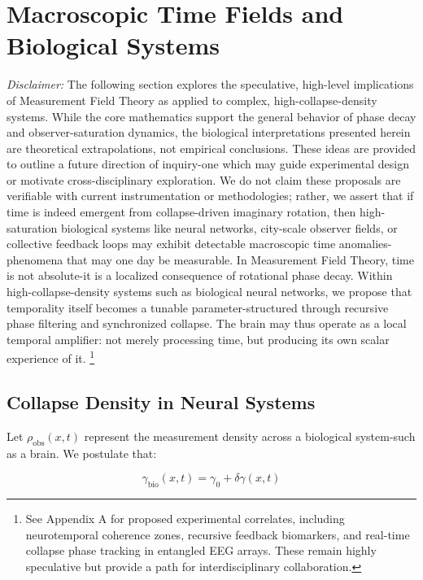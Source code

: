 \section{Macroscopic Time Fields and Biological Systems}

\textit{Disclaimer:} The following section explores the speculative, high-level implications of Measurement Field Theory as applied to complex, high-collapse-density systems. \cite{chapter_time} While the core mathematics support the general behavior of phase decay and observer-saturation dynamics, the biological interpretations presented herein are theoretical extrapolations, not empirical conclusions. \cite{chapter_time} These ideas are provided to outline a future direction of inquiry-one which may guide experimental design or motivate cross-disciplinary exploration. We do not claim these proposals are verifiable with current instrumentation or methodologies; rather, we assert that if time is indeed emergent from collapse-driven imaginary rotation, then high-saturation biological systems like neural networks, city-scale observer fields, or collective feedback loops may exhibit detectable macroscopic time anomalies-phenomena that may one day be measurable. \cite{chapter_time} In Measurement Field Theory, time is not absolute-it is a localized consequence of rotational phase decay. \cite{chapter_time} Within high-collapse-density systems such as biological neural networks, we propose that temporality itself becomes a tunable parameter-structured through recursive phase filtering and synchronized collapse. \cite{chapter_time} The brain may thus operate as a local temporal amplifier: not merely processing time, but producing its own scalar experience of it. \cite{chapter_time} \footnote{See Appendix A for proposed experimental correlates, including neurotemporal coherence zones, recursive feedback biomarkers, and real-time collapse phase tracking in entangled EEG arrays. \cite{chapter_time} These remain highly speculative but provide a path for interdisciplinary collaboration.}

\subsection*{Collapse Density in Neural Systems}

Let $\rho_{\text{obs}}(x,t)$ represent the measurement density across a biological system-such as a brain. \cite{chapter_time} We postulate that:

\[
\gamma_{\text{bio}}(x,t) = \gamma_0 + \delta \gamma(x,t)
\]

